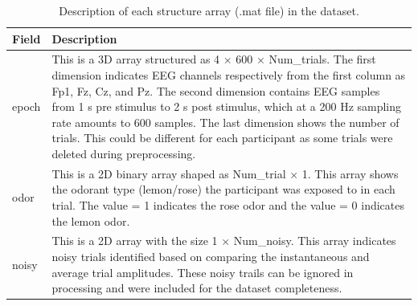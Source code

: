 \documentclass[12pt]{article}
\begin{document}
\begin{table}[]
	\begin{center}
		\begin{tabular}{  | l | p{13cm} |}
			\hline
			Field & Description                                                                                                                                                                                                                                                                                                                                                                                                                                               \\
			\hline
			epoch & This is a 3D array structured as 4 × 600 × Num\_trials. The first dimension indicates EEG channels respectively from the first column as Fp1, Fz, Cz, and Pz. The second dimension contains EEG samples from 1 s pre stimulus to 2 s post stimulus, which at a 200 Hz sampling rate amounts to 600 samples. The last dimension shows the number of trials. This could be different for each participant as some trials were deleted during preprocessing. \\
			\hline
			odor  & This is a 2D binary array shaped as Num\_trial × 1. This array shows the odorant type (lemon/rose) the participant was exposed to in each trial. The value = 1 indicates the rose odor and the value = 0 indicates the lemon odor.                                                                                                                                                                                                                        \\
			\hline
			noisy & This is a 2D array with the size 1 × Num\_noisy. This array indicates noisy trials identified based on comparing the instantaneous and average trial amplitudes. These noisy trails can be ignored in processing and were included for the dataset completeness.                                                                                                                                                                                          \\
			\hline
		\end{tabular}
		\label{tab:table1}
	\end{center}
	\caption{Description of each structure array (.mat file) in the dataset.}
	\label{table:Data-Structure}


\end{table}
\newpage
\end{document}
